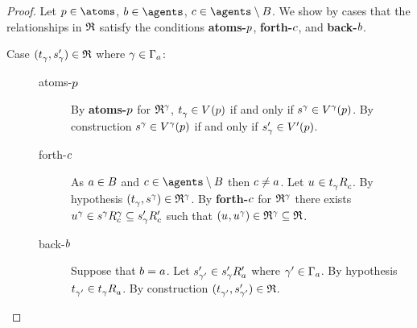 \begin{proof}
Let $\atomP \in \atoms$, $\agentB \in \agents$, $\agentC \in \agents \setminus \agentsB$.
We show by cases that the relationships in $\refinement$ satisfy the conditions {\bf atoms-$\atomP$}, {\bf forth-$\agentC$}, and {\bf back-$\agentB$}.

\begin{description}
    \item[{Case $(\kStateT_\gamma, \kStateSP_\gamma) \in \refinement$ where $\gamma \in \Gamma_\agentA$:}]
        \hfill
        \begin{description}
            \item[atoms-$\atomP$] 
                By {\bf atoms-$\atomP$} for $\refinement^\gamma$, $\kStateT_\gamma \in \kValuation(\atomP)$ if and only if $\kStateS[\gamma] \in \kValuation[\gamma](\atomP)$.
                By construction $\kStateS[\gamma] \in \kValuation[\gamma](\atomP)$ if and only if $\kStateSP_\gamma \in \kValuationP(\atomP)$.
            \item[forth-$\agentC$]
                As $\agentA \in \agentsB$ and $\agentC \in \agents \setminus \agentsB$ then $\agentC \neq \agentA$.
                Let $\kStateU \in \kSuccessorsC{\kStateT_\gamma}$.
                By hypothesis $(\kStateT_\gamma, \kStateS[\gamma]) \in \refinement^\gamma$.
                By {\bf forth-$\agentC$} for $\refinement^\gamma$ there exists $\kStateU[\gamma] \in \kSuccessorsC[\gamma]{\kStateS[\gamma]} \subseteq \kSuccessorsPC{\kStateSP_\gamma}$ such that $(\kStateU, \kStateU[\gamma]) \in \refinement^\gamma \subseteq \refinement$.
            \item[back-$\agentB$]
                Suppose that $\agentB = \agentA$.
                Let $\kStateSP_{\gamma'} \in \kSuccessorsPA{\kStateSP_\gamma}$ where $\gamma' \in \Gamma_\agentA$.
                By hypothesis $\kStateT_{\gamma'} \in \kSuccessorsA{\kStateT_\gamma}$.
                By construction $(\kStateT_{\gamma'}, \kStateSP_{\gamma'}) \in \refinement$.


\end{description}
\end{description}
\end{proof}
